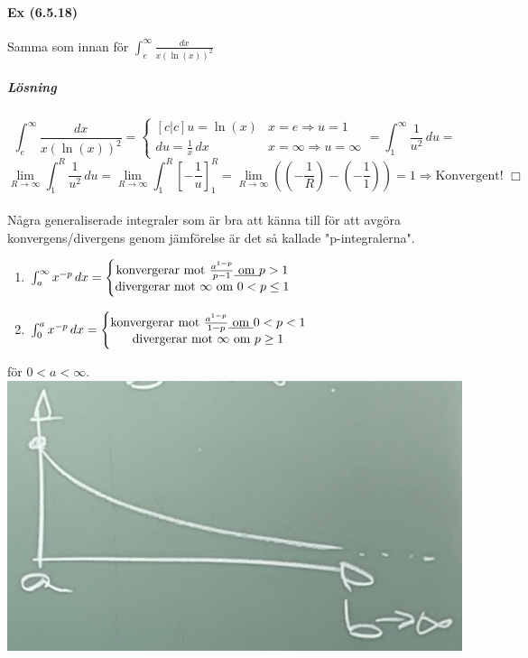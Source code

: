 \paragraph{Ex (6.5.18)} Samma som innan för $\int_e^\infty\frac{dx}{x(\ln(x))^2}$
\subparagraph{Lösning}
\begin{equation*}
    \int_e^\infty\frac{dx}{x(\ln(x))^2}=
    \left\lbrace
    \begin{matrix}[c|c]
        u=\ln(x)            & x=e\Rightarrow u=1           \\
        du=\frac{1}{x}\, dx & x=\infty\Rightarrow u=\infty
    \end{matrix}
    \right.=
    \int_1^\infty\frac{1}{u^2}\, du=
\end{equation*}
\begin{equation*}
    \lim_{R\to\infty}\int_1^R\frac{1}{u^2}\, du=
    \lim_{R\to\infty}\int_1^R[-\frac{1}{u}]_1^R=
    \lim_{R\to\infty}((-\frac{1}{R})-(-\frac{1}{1}))=
    1\Rightarrow\text{Konvergent! }\Box
\end{equation*}
~\\
Några generaliserade integraler som är bra att känna till för att avgöra konvergens/divergens genom jämförelse är det så kallade "p-integralerna".
\begin{enumerate}
    \item $\int_a^\infty x^{-p}\, dx=
              \left\lbrace
              \begin{matrix}
                  \text{konvergerar mot }\frac{a^{1-p}}{p-1}\text{\underline{ om }} p>1 \\
                  \text{divergerar mot }\infty \text{ om } 0<p\leq 1
              \end{matrix}
              \right.$
    \item $\int_0^a x^{-p}\, dx=
              \left\lbrace
              \begin{matrix}
                  \text{konvergerar mot }\frac{a^{1-p}}{1-p}\text{\underline{ om }} 0<p<1 \\
                  \text{divergerar mot }\infty \text{ om } p\geq 1
              \end{matrix}
              \right.$
\end{enumerate}
för $0<a<\infty$.\\
\includegraphics[scale=0.1]{lessons/lesson18/imgs/img04.jpg}

